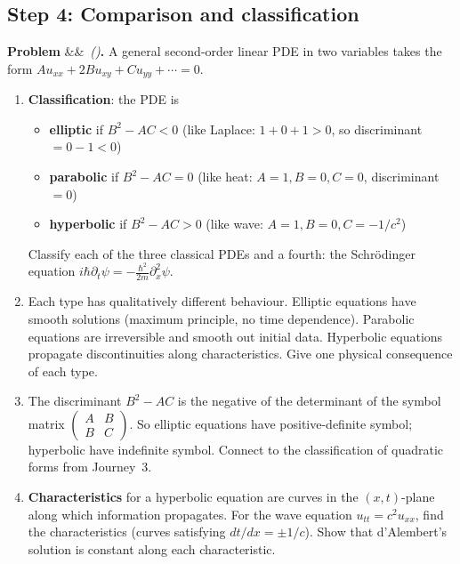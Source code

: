 \documentclass[12pt,a4paper]{article}
\newcounter{problem}
\newenvironment{problem}[1][]{\refstepcounter{problem}\par\vspace{6pt}\noindent\textbf{\color{MidBlue}Problem \theproblem}\ifx&#1&\else\ \textit{(#1)}\fi\textbf{.}\enskip}{\par\vspace{4pt}}
\begin{document}
\subsection{Step 4: Comparison and classification}

\begin{problem}
\label{prob:classification}
A general second-order linear PDE in two variables takes the form $Au_{xx}+2Bu_{xy}+Cu_{yy}+\cdots=0$.
\begin{enumerate}[label=(\alph*),topsep=2pt]
  \item \textbf{Classification}: the PDE is
    \begin{itemize}[noitemsep]
      \item \textbf{elliptic} if $B^2-AC<0$ (like Laplace: $1+0+1>0$, so discriminant $=0-1<0$)
      \item \textbf{parabolic} if $B^2-AC=0$ (like heat: $A=1,B=0,C=0$, discriminant $=0$)
      \item \textbf{hyperbolic} if $B^2-AC>0$ (like wave: $A=1,B=0,C=-1/c^2$)
    \end{itemize}
  Classify each of the three classical PDEs and a fourth: the Schr\"{o}dinger equation $i\hbar\partial_t\psi=-\frac{\hbar^2}{2m}\partial_x^2\psi$.
  \item Each type has qualitatively different behaviour. Elliptic equations have smooth solutions (maximum principle, no time dependence). Parabolic equations are irreversible and smooth out initial data. Hyperbolic equations propagate discontinuities along characteristics. Give one physical consequence of each type.
  \item The discriminant $B^2-AC$ is the negative of the determinant of the symbol matrix $\begin{pmatrix}A&B\\B&C\end{pmatrix}$. So elliptic equations have positive-definite symbol; hyperbolic have indefinite symbol. Connect to the classification of quadratic forms from Journey~3.
  \item \textbf{Characteristics} for a hyperbolic equation are curves in the $(x,t)$-plane along which information propagates. For the wave equation $u_{tt}=c^2u_{xx}$, find the characteristics (curves satisfying $dt/dx=\pm1/c$). Show that d'Alembert's solution is constant along each characteristic.
\end{enumerate}
\end{problem}
\end{document}
